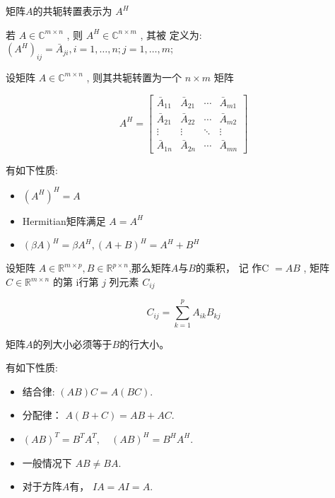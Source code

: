 \begin{definition}[共轭转置]
    矩阵$A$的共轭转置表示为 $ A^{{H}} $
    
    若 $ {A} \in \mathbb{C}^{m \times n} $ , 则 $ A^{H} \in \mathbb{C}^{n \times m} $ , 其被 定义为: $ \left(A^{H}\right)_{i j}=\bar{A}_{j i}, i=1, \ldots, n ; j=1, \ldots, m $;

    设矩阵 $ A \in \mathbb{C}^{m \times n} $ , 则其共轭转置为一个 $ n \times m $ 矩阵

\begin{equation}
A^{H}=\left[\begin{array}{cccc}
\bar{A}_{11} & \bar{A}_{21} & \cdots & \bar{A}_{m 1} \\
\bar{A}_{21} & \bar{A}_{22} & \cdots & \bar{A}_{m 2} \\
\vdots & \vdots & \ddots & \vdots \\
\bar{A}_{1 n} & \bar{A}_{2 n} & \cdots & \bar{A}_{m n}
\end{array}\right]
\end{equation}
\end{definition}

\begin{corollary}[共轭转置的性质]
    有如下性质:
    \begin{itemize}
        \item $ \left(A^{H}\right)^{H}=A $
        \item Hermitian矩阵满足 $ A=A^{H} $
        \item $ (\beta A)^{H}=\beta A^{H},(A+B)^{H}=A^{H}+B^{H} $
    \end{itemize}
\end{corollary}


\begin{definition}[矩阵乘法]
    设矩阵 $ A \in \mathbb{R}^{m \times p}, B \in \mathbb{R}^{p \times n} $,那么矩阵$A$与$B$的乘积， 记 作C $ =A B $ ,  矩阵 $ C \in \mathbb{R}^{m \times n} $ 的第 i行第 $ j $ 列元素 $ C_{i j} $

    \begin{equation}
{C}_{i j}=\sum_{k=1}^{p} A_{i k} B_{k j}
\end{equation}

\end{definition}

\begin{remark}
    矩阵$A$的列大小必须等于$B$的行大小。
\end{remark} 

\begin{corollary}[矩阵乘法性质]
    有如下性质:
    \begin{itemize}
        \item 结合律: $ (A B) C=A(B C) $.
        \item 分配律： $ A(B+C)=A B+A C $.
        \item $ (A B)^{T}=B^{T} A^{T}, \quad(A B)^{{H}}=B^{H} A^{H} $.
        \item 一般情况下 $ A B \neq B A $.
        \item 对于方阵$A$有， $ I A=A I=A $.
    \end{itemize} 
\end{corollary}

